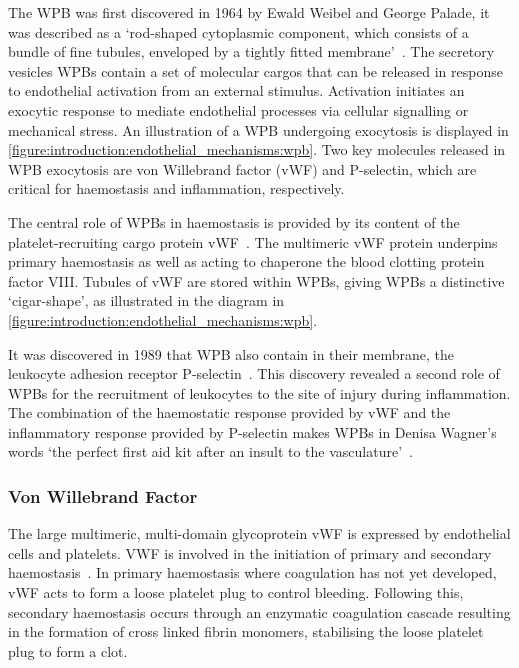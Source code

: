 The WPB was first discovered in 1964 by Ewald Weibel and George Palade, it was described as a `rod-shaped cytoplasmic component, which consists of a bundle of fine tubules, enveloped by a tightly fitted membrane'~\cite{Weibel1964}. The secretory vesicles WPBs contain a set of molecular cargos that can be released in response to endothelial activation from an external stimulus. Activation initiates an exocytic response to mediate endothelial processes via cellular signalling or mechanical stress. An illustration of a WPB undergoing exocytosis is displayed in \autoref{figure:introduction:endothelial_mechanisms:wpb}. Two key molecules released in WPB exocytosis are von Willebrand factor (vWF) and P-selectin, which are critical for haemostasis and inflammation, respectively.

The central role of WPBs in haemostasis is provided by its content of the platelet-recruiting cargo protein vWF~\cite{Wagner1982}. The multimeric vWF protein underpins primary haemostasis as well as acting to chaperone the blood clotting protein factor VIII. Tubules of vWF are stored within WPBs, giving WPBs a distinctive `cigar-shape', as illustrated in the diagram in \autoref{figure:introduction:endothelial_mechanisms:wpb}.

It was discovered in 1989 that WPB also contain in their membrane, the leukocyte adhesion receptor P-selectin~\cite{Bonfanti1989,McEver1989}. This discovery revealed a second role of WPBs for the recruitment of leukocytes to the site of injury during inflammation. The combination of the haemostatic response provided by vWF and the inflammatory response provided by P-selectin makes WPBs in Denisa Wagner's words `the perfect first aid kit after an insult to the vasculature'~\cite{Weibel2012}.

\subsubsection{Von Willebrand Factor}
\label{introduction:endothelial_cellular_biology:vwf}
The large multimeric, multi-domain glycoprotein vWF is expressed by endothelial cells and platelets. VWF is involved in the initiation of primary and secondary haemostasis~\cite{Metcalf2008}. In primary haemostasis where coagulation has not yet developed, vWF acts to form a loose platelet plug to control bleeding. Following this, secondary haemostasis occurs through an enzymatic coagulation cascade resulting in the formation of cross linked fibrin monomers, stabilising the loose platelet plug to form a clot.

